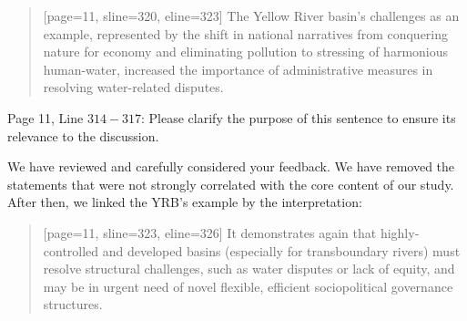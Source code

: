 \begin{quote}[page=11, sline=320, eline=323]
	The Yellow River basin's challenges as an example, represented by the shift in national narratives from conquering nature for economy and eliminating pollution to stressing of harmonious human-water, increased the importance of administrative measures in resolving water-related disputes.
\end{quote}

\RC{} Page 11, Line $314-317$: Please clarify the purpose of this sentence to ensure its relevance to the discussion.

\AR{} We have reviewed and carefully considered your feedback. We have removed the statements that were not strongly correlated with the core content of our study. After then, we linked the YRB's example by the interpretation:

\begin{quote}[page=11, sline=323, eline=326]
	It demonstrates again that highly-controlled and developed basins (especially for transboundary rivers) must resolve structural challenges, such as water disputes or lack of equity, and may be in urgent need of novel flexible, efficient sociopolitical governance structures.
\end{quote}
